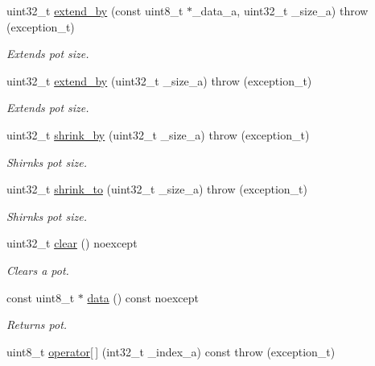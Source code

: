 \begin{DoxyCompactItemize}
uint32\+\_\+t \hyperlink{class_n_h_1_1_protocols_1_1_raw_1_1pot__t_a9a4d54dbbffeffaa1b5bf326ace30e8b}{extend\+\_\+by} (const uint8\+\_\+t $\ast$\+\_\+data\+\_\+a, uint32\+\_\+t \+\_\+size\+\_\+a)  throw (exception\+\_\+t)
\begin{DoxyCompactList}\small\item\em Extends pot size. \end{DoxyCompactList}\item 
uint32\+\_\+t \hyperlink{class_n_h_1_1_protocols_1_1_raw_1_1pot__t_a117097de61aa7d027381628d165a0ad2}{extend\+\_\+by} (uint32\+\_\+t \+\_\+size\+\_\+a)  throw (exception\+\_\+t)
\begin{DoxyCompactList}\small\item\em Extends pot size. \end{DoxyCompactList}\item 
uint32\+\_\+t \hyperlink{class_n_h_1_1_protocols_1_1_raw_1_1pot__t_ad705615b0cf4d0d7fe3ed4957711dbc4}{shrink\+\_\+by} (uint32\+\_\+t \+\_\+size\+\_\+a)  throw (exception\+\_\+t)
\begin{DoxyCompactList}\small\item\em Shirnks pot size. \end{DoxyCompactList}\item 
uint32\+\_\+t \hyperlink{class_n_h_1_1_protocols_1_1_raw_1_1pot__t_ab4fc8a6029016155ae39df75b8dbcdf8}{shrink\+\_\+to} (uint32\+\_\+t \+\_\+size\+\_\+a)  throw (exception\+\_\+t)
\begin{DoxyCompactList}\small\item\em Shirnks pot size. \end{DoxyCompactList}\item 
uint32\+\_\+t \hyperlink{class_n_h_1_1_protocols_1_1_raw_1_1pot__t_a42ef9135f8aaf966567fcd5ae71a8671}{clear} () noexcept
\begin{DoxyCompactList}\small\item\em Clears a pot. \end{DoxyCompactList}\item 
const uint8\+\_\+t $\ast$ \hyperlink{class_n_h_1_1_protocols_1_1_raw_1_1pot__t_af67504820aeff86c904925983d4644a1}{data} () const noexcept
\begin{DoxyCompactList}\small\item\em Returns pot. \end{DoxyCompactList}\item 
uint8\+\_\+t \hyperlink{class_n_h_1_1_protocols_1_1_raw_1_1pot__t_aebfc8267a6c20674a4cf7a2cd00081be}{operator\mbox{[}$\,$\mbox{]}} (int32\+\_\+t \+\_\+index\+\_\+a) const   throw (exception\+\_\+t)

\end{DoxyCompactItemize}

